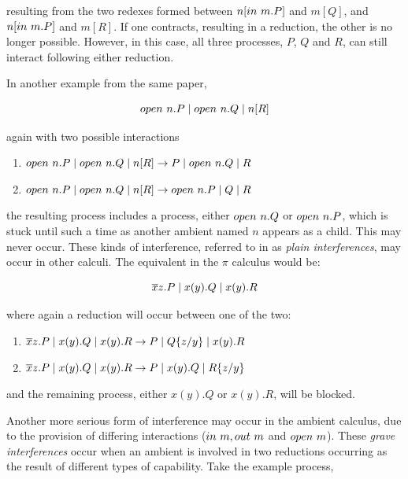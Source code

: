 \noindent resulting from the two redexes formed between
$n[in\ m.P]$ and $m[Q]$, and $n[in\ m.P]$ and $m[R]$.  If one
contracts, resulting in a reduction, the other is no longer possible.
However, in this case, all three processes, $P$, $Q$ and $R$, can
still interact following either reduction.

In another example from the same paper,

\begin{equation}
open\ n.P \;|\; open\ n.Q \;|\; n[R]
\end{equation}

\noindent again with two possible interactions

\begin{enumerate}
\item $open\ n.P \;|\; open\ n.Q \;|\; n[R] \rightarrow P \;|\; open\ n.Q \;|\; R$
\item $open\ n.P \;|\; open\ n.Q \;|\; n[R] \rightarrow
  open\ n.P \;|\; Q \;|\; R$
\end{enumerate}


\noindent the resulting process includes a process, either $open\ n.Q$
or $open\ n.P$, which is stuck until such a time as another ambient
named $n$ appears as a child.  This may never occur.  These kinds of
interference, referred to in \cite{sangiorgi:mobsafeambients} as
\emph{plain interferences}, may occur in other calculi.  The equivalent
in the $\pi$ calculus would be:

\begin{equation}
\overline{x}z.P \;|\; x(y).Q \;|\; x(y).R
\end{equation}

\noindent where again a reduction will occur between one of the two:

\begin{enumerate}
\item $\overline{x}z.P \;|\; x(y).Q \;|\; x(y).R \rightarrow P \;|\; Q\{z/y\}
  \;|\; x(y).R$
\item $\overline{x}z.P \;|\; x(y).Q \;|\; x(y).R \rightarrow P \;|\; x(y).Q
  \;|\; R\{z/y\}$
\end{enumerate}

\noindent and the remaining process, either $x(y).Q$ or $x(y).R$, will
be blocked.

Another more serious form of interference may occur in the ambient
calculus, due to the provision of differing interactions ($in\ m,
out\ m$ and $open\ m$).  These \emph{grave interferences} occur
when an ambient is involved in two reductions occurring as the result
of different types of capability.  Take the example process,

